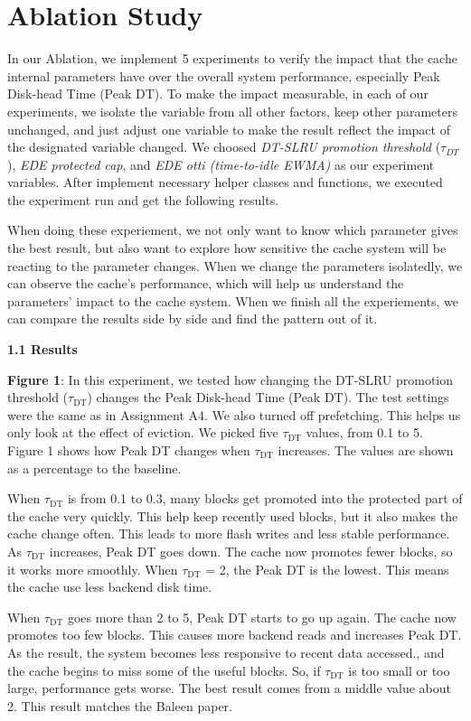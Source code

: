 \section{Ablation Study}
In our Ablation, we implement 5 experiments to verify the impact that the cache internal parameters have over the overall system performance, especially Peak Disk-head Time (Peak DT). To make the impact measurable, in each of our experiments, we isolate the variable from all other factors, keep other parameters unchanged, and just adjust one variable to make the result reflect the impact of the designated variable changed. We choosed \textit{DT-SLRU promotion threshold} ($\tau_{DT}$), \textit{EDE protected cap}, and \textit{EDE otti (time-to-idle EWMA)} as our experiment variables. After implement necessary helper classes and functions, we executed the experiment run and get the following results.

When doing these experiement, we not only want to know which parameter gives the best result, but also want to explore how sensitive the cache system will be reacting to the parameter changes. When we change the parameters isolatedly, we can observe the cache's performance, which will help us understand the parameters' impact to the cache system. When we finish all the experiements, we can compare the results side by side and find the pattern out of it.

\noindent\textbf{1.1 Results}  


\textbf{Figure 1}: In this experiment, we tested how changing the DT-SLRU promotion threshold ($\tau_{\text{DT}}$) changes the Peak Disk-head Time (Peak DT). The test settings were the same as in Assignment A4. We also turned off prefetching. This helps us only look at the effect of eviction. We picked five $\tau_{\text{DT}}$ values, from 0.1 to 5. Figure 1 shows how Peak DT changes when $\tau_{\text{DT}}$ increases. The values are shown as a percentage to the baseline.

When $\tau_{\text{DT}}$ is from 0.1 to 0.3, many blocks get promoted into the protected part of the cache very quickly. This help keep recently used blocks, but it also makes the cache change often. This leads to more flash writes and less stable performance. As $\tau_{\text{DT}}$ increases, Peak DT goes down. The cache now promotes fewer blocks, so it works more smoothly. When $\tau_{\text{DT}}$ = 2, the Peak DT is the lowest. This means the cache use less backend disk time.

When $\tau_{\text{DT}}$ goes more than 2 to 5, Peak DT starts to go up again. The cache now promotes too few blocks. This causes more backend reads and increases Peak DT. As the result, the system becomes less responsive to recent data accessed., and the cache begins to miss some of the useful blocks. So, if $\tau_{\text{DT}}$ is too small or too large, performance gets worse. The best result comes from a middle value about 2. This result matches the Baleen paper.



